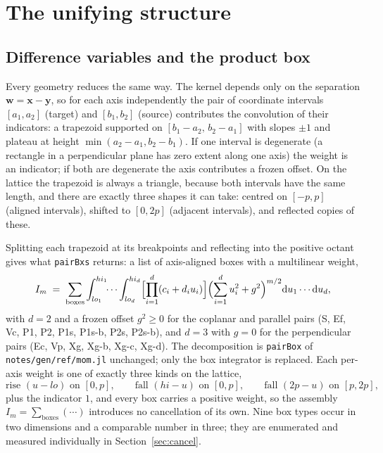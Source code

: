 \documentclass[11pt]{article}
\theoremstyle{remark}
\newcommand{\dd}{\mathrm{d}}
\newcommand{\code}[1]{\texttt{#1}}
\begin{document}
\section{The unifying structure}
\label{sec:struct}

\subsection{Difference variables and the product box}
\label{sec:pairbox}

Every geometry reduces the same way. The kernel depends only on the separation
$\mathbf{w} = \mathbf{x} - \mathbf{y}$, so for each axis independently the pair of
coordinate intervals $[a_1,a_2]$ (target) and $[b_1,b_2]$ (source) contributes the
convolution of their indicators: a trapezoid supported on $[b_1-a_2,\,b_2-a_1]$ with
slopes $\pm 1$ and plateau at height $\min(a_2-a_1, b_2-b_1)$. If one interval is
degenerate (a rectangle in a perpendicular plane has zero extent along one axis) the
weight is an indicator; if both are degenerate the axis contributes a frozen offset. On
the lattice the trapezoid is always a triangle, because both intervals have the same
length, and there are exactly three shapes it can take: centred on $[-p,p]$ (aligned
intervals), shifted to $[0,2p]$ (adjacent intervals), and reflected copies of these.

Splitting each trapezoid at its breakpoints and reflecting into the positive octant gives
what \code{pairBxs} returns: a list of axis-aligned boxes with a multilinear weight,
\begin{equation}
I_m \;=\; \sum_{\text{boxes}} \int_{lo_1}^{hi_1}\!\!\cdots\int_{lo_d}^{hi_d}
\Bigl[\prod_{i=1}^{d} (c_i + d_i u_i)\Bigr]\Bigl(\sum_{i=1}^{d} u_i^2 + g^2\Bigr)^{m/2}
\dd u_1\cdots \dd u_d ,
\label{eq:pairbox}
\end{equation}
with $d = 2$ and a frozen offset $g^2 \ge 0$ for the coplanar and parallel pairs
(S, Ef, Vc, P1, P2, P1s, P1s-b, P2s, P2s-b), and $d = 3$ with $g = 0$ for the
perpendicular pairs (Ec, Vp, Xg, Xg-b, Xg-c, Xg-d). The decomposition is
\code{pairBox} of \code{notes/gen/ref/mom.jl} unchanged; only the box integrator is
replaced. Each per-axis weight is one of exactly three kinds on the lattice,
\begin{equation}
\text{rise } (u - lo) \text{ on } [0,p], \qquad
\text{fall } (hi - u) \text{ on } [0,p], \qquad
\text{fall } (2p - u) \text{ on } [p,2p],
\end{equation}
plus the indicator $1$, and every box carries a positive weight, so the assembly
$I_m = \sum_{\text{boxes}}(\cdots)$ introduces no cancellation of its own. Nine box types
occur in two dimensions and a comparable number in three; they are enumerated and measured
individually in Section~\ref{sec:cancel}.
\end{document}
